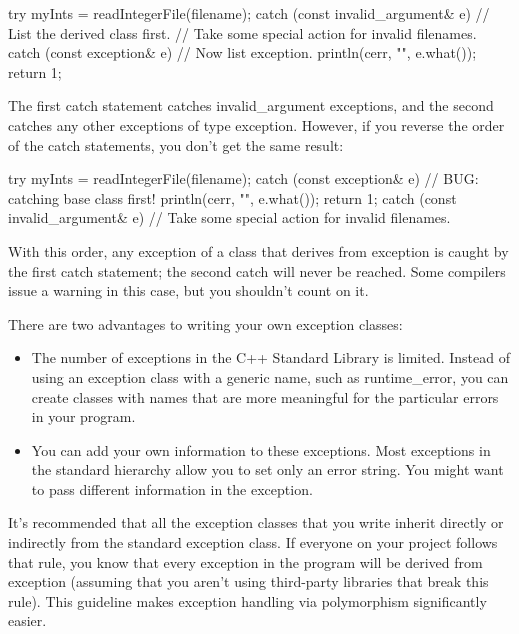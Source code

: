 \begin{cpp}
try {
    myInts = readIntegerFile(filename);
} catch (const invalid_argument& e) { // List the derived class first.
    // Take some special action for invalid filenames.
} catch (const exception& e) { // Now list exception.
    println(cerr, "{}", e.what());
    return 1;
}
\end{cpp}

The first catch statement catches invalid\_argument exceptions, and the second catches any other exceptions of type exception. However, if you reverse the order of the catch statements, you don’t get the same result:

\begin{cpp}
try {
    myInts = readIntegerFile(filename);
} catch (const exception& e) { // BUG: catching base class first!
    println(cerr, "{}", e.what());
    return 1;
} catch (const invalid_argument& e) {
    // Take some special action for invalid filenames.
}
\end{cpp}

With this order, any exception of a class that derives from exception is caught by the first catch statement; the second catch will never be reached. Some compilers issue a warning in this case, but you shouldn’t count on it.


There are two advantages to writing your own exception classes:

\begin{itemize}
\item
The number of exceptions in the C++ Standard Library is limited. Instead of using an exception class with a generic name, such as runtime\_error, you can create classes with names that are more meaningful for the particular errors in your program.

\item
You can add your own information to these exceptions. Most exceptions in the standard hierarchy allow you to set only an error string. You might want to pass different information in the exception.
\end{itemize}

It’s recommended that all the exception classes that you write inherit directly or indirectly from the standard exception class. If everyone on your project follows that rule, you know that every exception in the program will be derived from exception (assuming that you aren’t using third-party libraries that break this rule). This guideline makes exception handling via polymorphism significantly easier.

